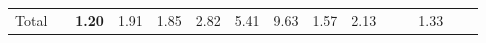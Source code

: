 \begin{tabular}{ll|rrrrrr|rrrrrrr}
  \hline
  Total  & &



  


  
  \textbf{1.20} & 1.91 & 1.85 & 2.82 & 5.41 & 9.63 & 1.57 & 2.13 &  &  & 1.33 \\


\end{tabular}
